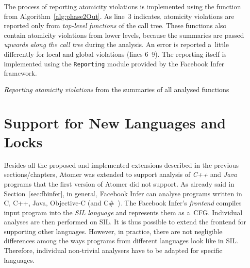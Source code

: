 The process of reporting atomicity violations is implemented using the function from Algorithm~\ref{alg:phase2Out}. As line~3 indicates, atomicity violations are reported only from \emph{top-level functions} of the call tree. These functions also contain atomicity violations from lower levels, because the summaries are passed \emph{upwards along the call tree} during the analysis. An error is reported a~little differently for local and global violations (lines 6--9). The reporting itself is implemented using the \texttt{Reporting} module provided by the Facebook Infer framework.

\begin{algorithm}[hbt]
%
%
    \caption{\emph{Reporting atomicity violations} from the summaries of all analysed functions}
    \label{alg:phase2Out}
\end{algorithm}


\section{Support for New Languages and Locks}
\label{sec:implementLanguages}

Besides all the proposed and implemented extensions described in the previous sections/chapters, Atomer was extended to support analysis of \emph{C++} and \emph{Java} programs that the first version of Atomer did not support. As already said in Section~\ref{sec:fbinfer}, in general, Facebook Infer can analyse programs written in C, C++, Java, Objective-C (and C\#~\cite{inferCSharp}). The Facebook Infer's \emph{frontend} compiles input program into the \emph{SIL language} and represents them as a~CFG. Individual analyses are then performed on SIL. It is thus possible to extend the frontend for supporting other languages. However, in practice, there are not negligible differences among the ways programs from different languages look like in SIL. Therefore, individual non-trivial analysers have to be adapted for specific languages.

